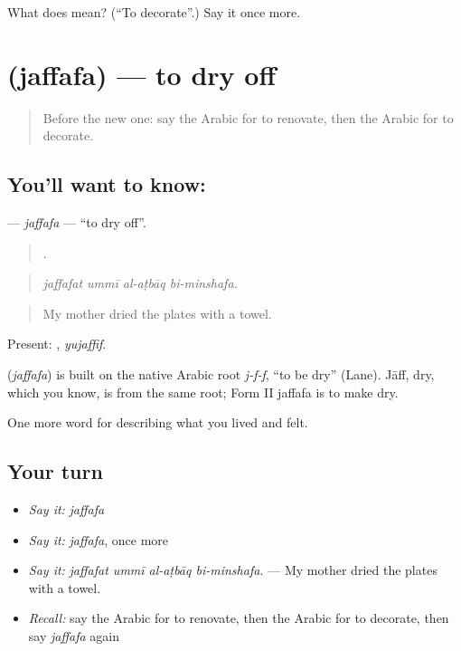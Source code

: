 \begin{tcolorbox}[breakable,colback=teal!4,colframe=teal!35!black,title={Before you move on}]
What does  mean? (\textquotedblleft{}To decorate\textquotedblright{}.) Say it once more.
\end{tcolorbox}
\section[\texorpdfstring{\ar{جفف} (jaffafa)}{جفف (jaffafa)}]{ (jaffafa) — to dry off}

\label{lesson:AR-C552-jaffafa}



\begin{quote}
Before the new one: say the Arabic for to renovate, then the Arabic for to decorate.
\end{quote}

\subsection*{You'll want to know: }
\textbf{} — \emph{jaffafa} — \textquotedblleft{}to dry off\textquotedblright{}.

\begin{quote}
   .
\end{quote}

\begin{quote}
\emph{jaffafat ummī al-aṭbāq bi-minshafa.}
\end{quote}

\begin{quote}
My mother dried the plates with a towel.
\end{quote}

Present: , \emph{yujaffif}.

\begin{cousinweb}
\textbf{} (\emph{jaffafa}) is built on the native Arabic root \emph{j-f-f}, \textquotedblleft{}to be dry\textquotedblright{} (Lane). Jāff, dry, which you know, is from the same root; Form II jaffafa is to make dry.
\end{cousinweb}

\begin{grammarlens}[title={What you've built}]
One more word for describing what you lived and felt.
\end{grammarlens}

\subsection*{Your turn}
\begin{itemize}
\raggedright
  \item \emph{Say it:} \emph{jaffafa}
  \item \emph{Say it:} \emph{jaffafa}, once more
  \item \emph{Say it:} \emph{jaffafat ummī al-aṭbāq bi-minshafa.} — My mother dried the plates with a towel.
  \item \emph{Recall:} say the Arabic for to renovate, then the Arabic for to decorate, then say \emph{jaffafa} again
\end{itemize}

